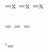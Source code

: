 \newcount\b@px  \newcount\b@nx
\newcount\b@pxi \newcount\b@nxi
\newcount\b@pxii\newcount\b@nxii

\newcount\n@px  \n@px\@ne
\newcount\n@pxi \n@pxi\@ne
\newcount\n@pxii\n@pxii\@ne

\newskip\s@xx
\newskip\s@xxi
\newskip\s@xxii
\newskip\s@Yx
\newskip\s@Yxi
\newskip\s@Yxii
\newskip\s@ax
\newskip\s@axi
\newskip\s@axii
\newtoks\s@sx  \s@sx={x}
\newtoks\s@sxi \s@sxi={x}
\newtoks\s@sxii\s@sxii={x}
\newcount\s@yx
\newcount\s@yxi
\newcount\s@yxii
\newcount\s@Nx
\newcount\s@Nxi
\newcount\s@Nxii
\newcount\s@zx  \s@zx\maxdimen
\newcount\s@zxi \s@zxi\maxdimen
\newcount\s@zxii\s@zxii\maxdimen
\newtoks\s@dx
\newtoks\s@dxi
\newtoks\s@dxii

\newcount\a@sx  \newcount\o@sx
\newcount\a@sxi \newcount\o@sxi
\newcount\a@sxii\newcount\o@sxii

\newtoks\a@cx   \a@cx={{\z@}{\z@}{\z@}{\z@}}
\newtoks\a@cxi  \a@cxi={{\z@}{\z@}{\z@}{\z@}}
\newtoks\a@cxii \a@cxii={{\z@}{\z@}{\z@}{\z@}}

\newtoks\o@cx
\newtoks\o@cxi
\newtoks\o@cxii

\newtoks\m@tx
\newtoks\m@txi
\newtoks\m@txii

\def\resetlayout{\let\interfacteur\nin@
  \stafftopmarg\thr@@\Interligne \staffbotmarg\thr@@\Interligne
  \let\n@li\fiv@ \let\n@lii\fiv@ \let\n@liii\fiv@
  \let\n@liv\fiv@ \let\n@lv\fiv@ \let\n@lvi\fiv@
  \let\n@lvii\fiv@ \let\n@lviii\fiv@ \let\n@lix\fiv@
  \let\n@lx\fiv@ \let\n@lxi\fiv@ \let\n@lxii\fiv@
  \resetclefsymbols}

\def\resetclefsymbols{%
  \let\treblec@si\z@ \let\treblec@sii\z@ \let\treblec@siii\z@ \let\treblec@siv\z@
  \let\treblec@sv\z@ \let\treblec@svi\z@ \let\treblec@svii\z@ \let\treblec@sviii\z@ \let\treblec@six\z@
  \let\treblec@sx\z@ \let\treblec@sxi\z@ \let\treblec@sxii\z@
  \let\altoc@si\z@ \let\altoc@sii\z@ \let\altoc@siii\z@ \let\altoc@siv\z@
  \let\altoc@sv\z@ \let\altoc@svi\z@ \let\altoc@svii\z@ \let\altoc@sviii\z@ \let\altoc@six\z@
  \let\altoc@sx\z@ \let\altoc@sxi\z@ \let\altoc@sxii\z@
  \let\bassc@si\z@ \let\bassc@sii\z@ \let\bassc@siii\z@ \let\bassc@siv\z@
  \let\bassc@sv\z@ \let\bassc@svi\z@ \let\bassc@svii\z@ \let\bassc@sviii\z@ \let\bassc@six\z@
  \let\bassc@sx\z@ \let\bassc@sxi\z@ \let\bassc@sxii\z@
}

\let\nbinstruments\maxinstruments
\normalnotesize\resetlayout
\let\nbinstruments\@ne

\let\wlog\@wloG

\catcode`\@=\catcodeat
\endinput
